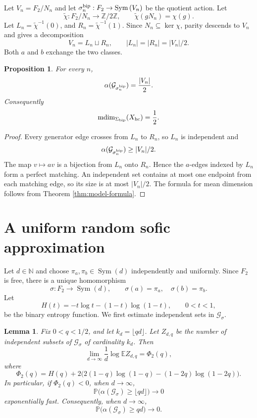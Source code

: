 \documentclass[12pt,a4paper]{amsart}
\newtheorem{proposition}[theorem]{Proposition}
\newtheorem{lemma}[theorem]{Lemma}
\theoremstyle{definition}
\newcommand{\mdim}{\operatorname{mdim}}
\newcommand{\Sym}{\operatorname{Sym}}
\newcommand{\ind}{\alpha}
\newcommand{\cG}{\mathcal G}
\newcommand{\N}{\mathbb N}
\newcommand{\Z}{\mathbb Z}
\begin{document}
	Let $V_n=F_2/N_n$ and let $\sigma_n^{\rm bip}: F_2 \rightarrow \Sym{(V_n)}$ 
 be the quotient action.  
	Let
	\[
	\widetilde\chi:F_2/N_{n}\to\Z/2\Z,
	\qquad \widetilde\chi(gN_{n})=\chi(g).
	\]
Let
$L_n=\widetilde\chi^{-1}(0)$, and $R_n=\widetilde\chi^{-1}(1)$.
Since $N_n\subseteq\ker\chi$, parity descends to $V_n$ and gives a decomposition
	\[
	V_n=L_n\sqcup R_n,
	\qquad |L_n|=|R_n|=|V_n|/2.
	\]
	Both $a$ and $b$ exchange the two classes.
	
	\begin{proposition}\label{prop:bip-alpha}
		For every $n$,
		\[
		\ind(\cG_{\sigma_n^{\rm bip}})=\frac{|V_n|}{2}.
		\]
		Consequently
		\[
		\mdim_{\Sigma_{\rm bip}}(X_{\rm hc})=\frac12.
		\]
	\end{proposition}
	
	\begin{proof}
		Every generator edge crosses from $L_n$ to $R_n$, so $L_n$ is independent and
		\[
		\ind(\cG_{\sigma_n^{\rm bip}})\ge |V_n|/2.
		\]
		The map $v\mapsto av$ is a bijection from $L_n$ onto $R_n$.  Hence the $a$-edges indexed by $L_n$ form a perfect matching.  An independent set contains at most one endpoint from each matching edge, so its size is at most $|V_n|/2$.  The formula for mean dimension follows from Theorem \ref{thm:model-formula}.
	\end{proof}
	
	\section{A uniform random sofic approximation}\label{sec5}
	
	Let $d\in\N$ and choose $\pi_a,\pi_b\in\Sym(d)$ independently and uniformly.  Since $F_2$ is free, there is a unique homomorphism
	\[
	\sigma:F_2\to\Sym(d),
	\qquad \sigma(a)=\pi_a,
	\quad \sigma(b)=\pi_b.
	\]
    Let
\[
 H(t)=-t\log t-(1-t)\log(1-t),\qquad 0<t<1,
\]
be the binary entropy function.
	We first estimate independent sets in $\cG_\sigma$.
	
	\begin{lemma}\label{lem:first-moment}
		Fix $0<q<1/2$, and let $k_d=\lfloor qd\rfloor$.  Let $Z_{d,q}$ be the number of independent subsets of $\cG_\sigma$ of cardinality $k_d$.  Then
		\[
		\lim_{d\to\infty}\frac1d\log\mathbb E Z_{d,q}
		=\Phi_2(q),
		\]
		where
		\[
		\Phi_2(q)=H(q)+2\bigl(2(1-q)\log(1-q)
		-(1-2q)\log(1-2q)\bigr).
		\]
		In particular, if $\Phi_2(q)<0$, when $d \longrightarrow \infty$, 
		\[
		\mathbb P\bigl(\ind(\cG_\sigma)\ge \lfloor qd\rfloor\bigr)\longrightarrow0
		\]
		exponentially fast.  Consequently, when $d \longrightarrow \infty$, 
		\[
		\mathbb P\bigl(\ind(\cG_\sigma)\ge qd\bigr)\longrightarrow0.
		\]
	\end{lemma}
	
\end{document}
